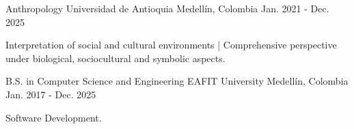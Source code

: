 

\begin{cventries}

  \cventry
    {Anthropology} %
    {Universidad de Antioquia} %
    {Medellín, Colombia} %
    {Jan. 2021 - Dec. 2025} %
    {
      \begin{cvitems} %
        \item {Interpretation of social and cultural environments | Comprehensive perspective under biological, sociocultural and symbolic aspects.}
      \end{cvitems}
    }
  \cventry
    {B.S. in Computer Science and Engineering} %
    {EAFIT University} %
    {Medellín, Colombia} %
    {Jan. 2017 - Dec. 2025} %
    {
      \begin{cvitems} %
        \item {Software Development.}
      \end{cvitems}
    }
\end{cventries}
